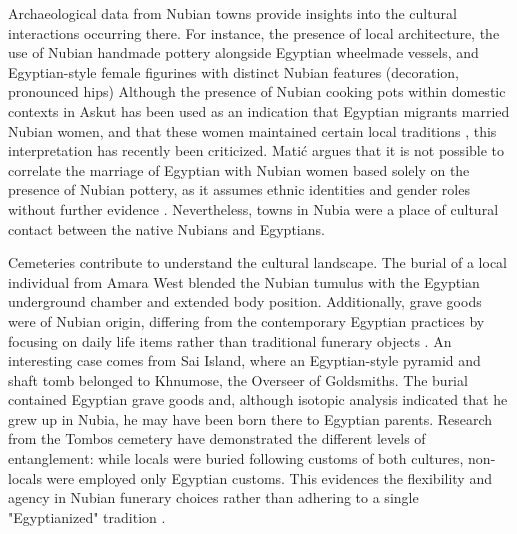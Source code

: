Archaeological data from Nubian towns provide insights into the cultural interactions occurring there. For instance, the presence of local architecture, the use of Nubian handmade pottery alongside Egyptian wheelmade vessels, and Egyptian-style female figurines with distinct Nubian features (decoration, pronounced hips) \parencites{spencerNubianArchitectureEgyptian2010, spencerIntroductionHistoryHistoriography2017, spencerMaintainingRamessideEmpire2024}[p.~183]{budkaLifeNewKingdom2012}[p.~471]{roseSesebiCeramicsChronology2017}{stevensFemaleFigurinesFolk2017}[p.~225]{budkaMaterialRemainsNew2020}
Although the presence of Nubian cooking pots within domestic contexts in Askut has been used as an indication that Egyptian migrants married Nubian women, and that these women maintained certain local traditions \parencites{smithWretchedKushEthnic2003, smithEthnicityCulture2007}[p.~540]{vanpeltRevisingEgyptoNubianRelations2013}{smithEthnicityConstructionsSelf2018}, this interpretation has recently been criticized. Matić argues that it is not possible to correlate the marriage of Egyptian with Nubian women based solely on the presence of Nubian pottery, as it assumes ethnic identities and gender roles without further evidence \parencite[p.~41-43]{matićEthnicIdentitiesLand2020}. Nevertheless, towns in Nubia were a place of cultural contact between the native Nubians and Egyptians.


Cemeteries contribute to understand the cultural landscape. The burial of a local individual from Amara West blended the Nubian tumulus with the Egyptian underground chamber and extended body position. Additionally, grave goods were of Nubian origin, differing from the contemporary Egyptian practices by focusing on daily life items rather than traditional funerary objects \parencites[p.~594-607]{binderNewKingdomTombs2017}[p.~44-45]{spencerMaintainingRamessideEmpire2024}.
An interesting case comes from Sai Island, where an Egyptian-style pyramid and shaft tomb belonged to Khnumose, the Overseer of Goldsmiths\parencite{retzmannNewKingdomPopulation2019}. The burial contained Egyptian grave goods and, although isotopic analysis indicated that he grew up in Nubia, he may have been born there to Egyptian parents. Research from the Tombos cemetery have demonstrated the different levels of entanglement: while locals were buried following customs of both cultures, non-locals were employed only Egyptian customs. This evidences the flexibility and agency in Nubian funerary choices rather than adhering to a single "Egyptianized" tradition \parencites[p.~6]{buzonStrontiumIsotope87Sr2013}[p.~291-292]{buzonEntanglementFormationAncient2016}[p.~207]{smithFortifiedSettlementTombos2018}{schraderIntraregional87Sr86Sr2019} [p.~102]{smithCrossCulturalInteractionAncient2018} [p.~12-16]{buzonExploringIntersectionalIdentities2024}.


